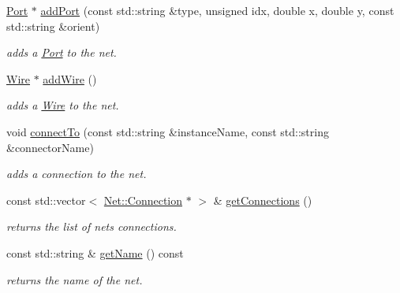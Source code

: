 \begin{DoxyCompactItemize}
\item 
\hyperlink{class_open_chams_1_1_port}{Port} $\ast$ \hyperlink{class_open_chams_1_1_net_af395a7c9d6f3c2b24500b91260873664}{add\+Port} (const std\+::string \&type, unsigned idx, double x, double y, const std\+::string \&orient)
\begin{DoxyCompactList}\small\item\em adds a \hyperlink{class_open_chams_1_1_port}{Port} to the net. \end{DoxyCompactList}\item 
\hyperlink{class_open_chams_1_1_wire}{Wire} $\ast$ \hyperlink{class_open_chams_1_1_net_a643a969f62770301b8b70ed63c36a55e}{add\+Wire} ()
\begin{DoxyCompactList}\small\item\em adds a \hyperlink{class_open_chams_1_1_wire}{Wire} to the net. \end{DoxyCompactList}\item 
void \hyperlink{class_open_chams_1_1_net_a40c2c019175ba3bfa4b90f4ad5d06483}{connect\+To} (const std\+::string \&instance\+Name, const std\+::string \&connector\+Name)
\begin{DoxyCompactList}\small\item\em adds a connection to the net. \end{DoxyCompactList}\item 
\mbox{\label{class_open_chams_1_1_net_a87e7c71b25171dd479af0488865c8179}} 
const std\+::vector$<$ \hyperlink{class_open_chams_1_1_net_1_1_connection}{Net\+::\+Connection} $\ast$ $>$ \& \hyperlink{class_open_chams_1_1_net_a87e7c71b25171dd479af0488865c8179}{get\+Connections} ()
\begin{DoxyCompactList}\small\item\em returns the list of net\textquotesingle{}s connections. \end{DoxyCompactList}\item 
\mbox{\label{class_open_chams_1_1_net_a3fd7335faa33dce2f87c7e50eef3e294}} 
const std\+::string \& \hyperlink{class_open_chams_1_1_net_a3fd7335faa33dce2f87c7e50eef3e294}{get\+Name} () const
\begin{DoxyCompactList}\small\item\em returns the name of the net. \end{DoxyCompactList}\item 

\end{DoxyCompactItemize}
